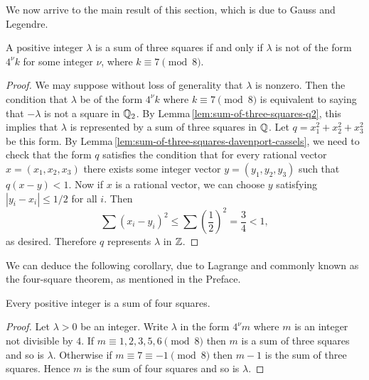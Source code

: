 We now arrive to the main result of this section, which is due to Gauss and Legendre.

\begin{theorem}
    {\normalfont \cite[pp.\,46--47]{serre2012course}}
    A positive integer \(\lambda\) is a sum of three squares if and only if \(\lambda\) is not of the form \(4^\nu k\) for some integer \(\nu\), where \(k \equiv 7 \pmod{8}\).
\end{theorem}

\begin{proof}
    We may suppose without loss of generality that \(\lambda\) is nonzero. Then the condition that \(\lambda\) be of the form \(4^\nu k\) where \(k \equiv 7 \pmod{8}\) is equivalent to saying that \(-\lambda\) is not a square in \(\mathbb{Q}_2\). By Lemma\,\ref{lem:sum-of-three-squares-q2}, this implies that \(\lambda\) is represented by a sum of three squares in \(\mathbb{Q}\). Let \(q = x_1^2 + x_2^2 + x_3^2\) be this form. By Lemma\,\ref{lem:sum-of-three-squares-davenport-cassels}, we need to check that the form \(q\) satisfies the condition that for every rational vector \(x = (x_1, x_2, x_3)\) there exists some integer vector \(y = (y_1, y_2, y_3)\) such that \(q(x - y) < 1\). Now if \(x\) is a rational vector, we can choose \(y\) satisfying \(|y_i - x_i| \leq 1/2\) for all \(i\). Then
    \[
        \sum(x_i - y_i)^2 \leq \sum \left(\frac{1}{2}\right)^2 = \frac{3}{4} < 1,
    \]
    as desired. Therefore \(q\) represents \(\lambda\) in \(\mathbb{Z}\).
\end{proof}

We can deduce the following corollary, due to Lagrange and commonly known as the four-square theorem, as mentioned in the Preface.

\begin{corollary}
    Every positive integer is a sum of four squares.
\end{corollary}

\begin{proof}
    Let \(\lambda > 0\) be an integer. Write \(\lambda\) in the form \(4^{\nu}m\) where \(m\) is an integer not divisible by \(4\). If \(m \equiv 1, 2, 3, 5, 6 \pmod{8}\) then \(m\) is a sum of three squares and so is \(\lambda\). Otherwise if \(m \equiv 7 \equiv -1 \pmod{8}\) then \(m-1\) is the sum of three squares. Hence \(m\) is the sum of four squares and so is \(\lambda\).
\end{proof}


